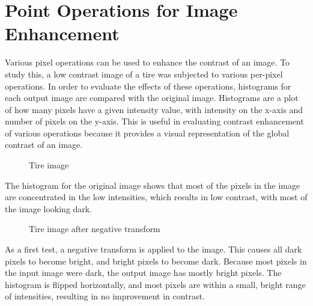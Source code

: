 \documentclass{sydeStyle}
\begin{document}
\section*{Point Operations for Image Enhancement}
Various pixel operations can be used to enhance the contrast of an image.
To study this, a low contrast image of a tire was subjected to various per-pixel
operations.
In order to evaluate the effects of these operations, histograms for each output
image are compared with the original image.
Histograms are a plot of how many pixels have a given intensity value, with
intensity on the x-axis and number of pixels on the y-axis.
This is useful in evaluating contrast enhancement of various operations because
it provides a visual representation of the global contrast of an image.
 \begin{figure}
	\begin{center}
	\end{center}
	\caption{Tire image}
\end{figure}

The histogram for the original image shows that most of the pixels in the image
are concentrated in the low intensities, which results in low contrast, with
most of the image looking dark.

 \begin{figure}
	\begin{center}
	\end{center}
	\caption{Tire image after negative transform}
\end{figure}
As a first test, a negative transform is applied to the image.
This causes all dark pixels to become bright, and bright pixels to become dark.
Because most pixels in the input image were dark, the output image has mostly
bright pixels.
The histogram is flipped horizontally, and most pixels are within a small,
bright range of intensities, resulting in no improvement in contrast.
\end{document}

